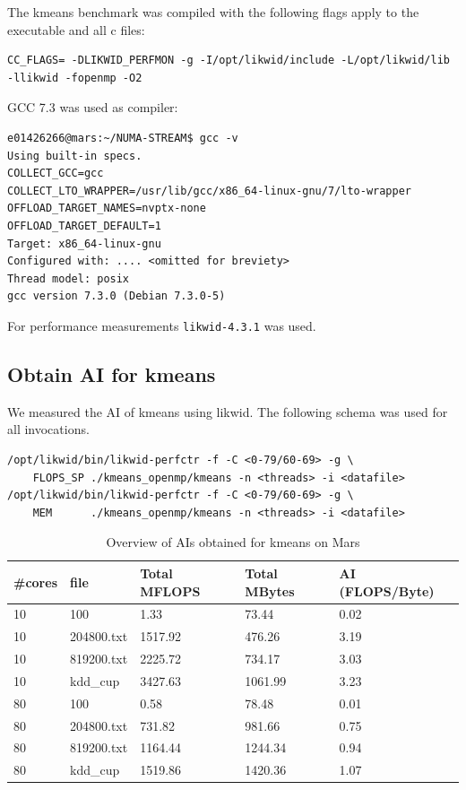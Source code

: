 The kmeans benchmark was compiled with the following flags apply to the executable and all c files:

\begin{verbatim}
CC_FLAGS= -DLIKWID_PERFMON -g -I/opt/likwid/include -L/opt/likwid/lib -llikwid -fopenmp -O2
\end{verbatim}

\noindent GCC 7.3 was used as compiler:

\begin{verbatim}
e01426266@mars:~/NUMA-STREAM$ gcc -v
Using built-in specs.
COLLECT_GCC=gcc
COLLECT_LTO_WRAPPER=/usr/lib/gcc/x86_64-linux-gnu/7/lto-wrapper
OFFLOAD_TARGET_NAMES=nvptx-none
OFFLOAD_TARGET_DEFAULT=1
Target: x86_64-linux-gnu
Configured with: .... <omitted for breviety>
Thread model: posix
gcc version 7.3.0 (Debian 7.3.0-5)
\end{verbatim}

\noindent For performance measurements \texttt{likwid-4.3.1} was used.

\subsection{Obtain AI for kmeans}

We measured the AI of kmeans using likwid. The following schema was used for all invocations.
\begin{verbatim}
/opt/likwid/bin/likwid-perfctr -f -C <0-79/60-69> -g \
    FLOPS_SP ./kmeans_openmp/kmeans -n <threads> -i <datafile>
/opt/likwid/bin/likwid-perfctr -f -C <0-79/60-69> -g \
    MEM      ./kmeans_openmp/kmeans -n <threads> -i <datafile>
\end{verbatim}



\begin{table}[h]
\centering
\caption{\label{tab:ai_tab}Overview of AIs obtained for kmeans on Mars}
\begin{small}
\begin{tabular}{lllll}
\toprule
\#cores & file & Total MFLOPS & Total MBytes & AI (FLOPS/Byte) \\
\midrule
10 & 100 & 1.33 & 73.44 & 0.02 \\
10 & 204800.txt & 1517.92 & 476.26 & 3.19 \\
10 & 819200.txt & 2225.72 & 734.17 & 3.03 \\
10 & kdd\_cup & 3427.63 & 1061.99 & 3.23 \\
80 & 100 & 0.58 & 78.48 & 0.01 \\
80 & 204800.txt & 731.82 & 981.66 & 0.75 \\
80 & 819200.txt & 1164.44 & 1244.34 & 0.94 \\
80 & kdd\_cup & 1519.86 & 1420.36 & 1.07 \\
\bottomrule
\end{tabular}
\end{small}
\end{table}

